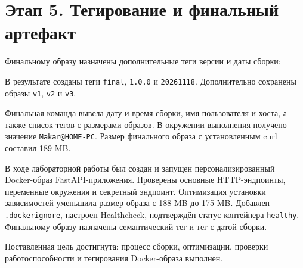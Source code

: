 
\section{Этап 5. Тегирование и финальный артефакт}

Финальному образу назначены дополнительные теги версии и даты сборки:


В результате созданы теги \texttt{final}, \texttt{1.0.0} и
\texttt{20261118}. Дополнительно сохранены образы \texttt{v1},
\texttt{v2} и \texttt{v3}.

Финальная команда вывела дату и время сборки, имя пользователя и
хоста, а также список тегов с размерами образов. В окружении выполнения
получено значение \texttt{Makar@HOME-PC}. Размер финального образа
с установленным curl составил 189 MB.



В ходе лабораторной работы был создан и запущен персонализированный
Docker-образ FastAPI-приложения. Проверены основные HTTP-эндпоинты,
переменные окружения и секретный эндпоинт. Оптимизация установки
зависимостей уменьшила размер образа с 188 MB до 175 MB. Добавлен
\texttt{.dockerignore}, настроен Healthcheck, подтверждён статус
контейнера \texttt{healthy}. Финальному образу назначены семантический
тег и тег с датой сборки.

Поставленная цель достигнута: процесс сборки, оптимизации, проверки
работоспособности и тегирования Docker-образа выполнен.


